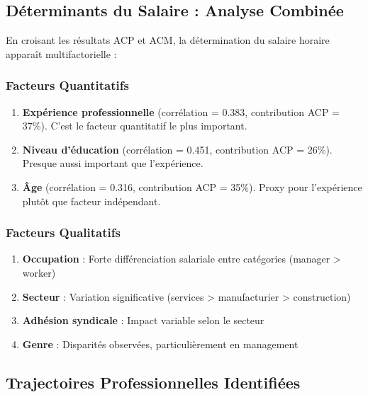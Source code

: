 \documentclass[12pt,a4paper]{report}
\begin{document}
\subsection{Déterminants du Salaire : Analyse Combinée}

En croisant les résultats ACP et ACM, la détermination du salaire horaire apparaît multifactorielle :

\subsubsection{Facteurs Quantitatifs}

\begin{enumerate}
    \item \textbf{Expérience professionnelle} (corrélation = 0.383, contribution ACP = 37\%). C'est le facteur quantitatif le plus important.
    
    \item \textbf{Niveau d'éducation} (corrélation = 0.451, contribution ACP = 26\%). Presque aussi important que l'expérience.
    
    \item \textbf{Âge} (corrélation = 0.316, contribution ACP = 35\%). Proxy pour l'expérience plutôt que facteur indépendant.
\end{enumerate}

\subsubsection{Facteurs Qualitatifs}

\begin{enumerate}
    \item \textbf{Occupation} : Forte différenciation salariale entre catégories (manager > worker)
    
    \item \textbf{Secteur} : Variation significative (services > manufacturier > construction)
    
    \item \textbf{Adhésion syndicale} : Impact variable selon le secteur
    
    \item \textbf{Genre} : Disparités observées, particulièrement en management
\end{enumerate}

\subsection{Trajectoires Professionnelles Identifiées}
\end{document}
